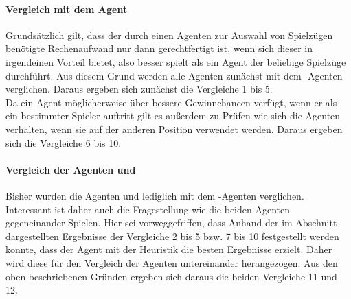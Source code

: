 \paragraph{Vergleich mit dem Agent }
Grundsätzlich gilt, dass der durch einen Agenten zur Auswahl von Spielzügen benötigte Rechenaufwand nur dann gerechtfertigt ist, wenn sich dieser in irgendeinen Vorteil bietet, also besser spielt als ein Agent der beliebige Spielzüge durchführt. Aus diesem Grund werden alle Agenten zunächst mit dem -Agenten verglichen. Daraus ergeben sich zunächst die Vergleiche 1 bis 5.
\\Da ein Agent möglicherweise über bessere Gewinnchancen verfügt, wenn er als ein bestimmter Spieler auftritt gilt es außerdem zu Prüfen wie sich die Agenten verhalten, wenn sie auf der anderen Position verwendet werden. Daraus ergeben sich die Vergleiche 6 bis 10. 

\paragraph{Vergleich der Agenten  und }
Bisher wurden die Agenten  und  lediglich mit dem -Agenten verglichen. Interessant ist daher auch die Fragestellung wie die beiden Agenten gegeneinander Spielen. Hier sei vorweggefriffen, dass Anhand der im Abschnitt  dargestellten Ergebnisse der Vergleiche 2 bis 5 bzw. 7 bis 10 festgestellt werden konnte, dass der Agent  mit der Heuristik   die besten Ergebnisse erzielt. Daher wird diese für den Vergleich der Agenten untereinander herangezogen. Aus den oben beschriebenen Gründen ergeben sich daraus die beiden Vergleiche 11 und 12.

